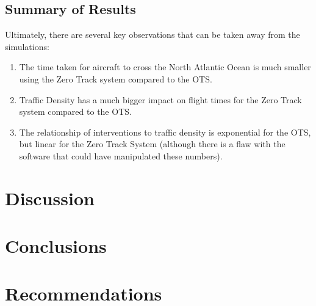 \documentclass[stu, a4paper, 12pt, floatsintext]{apa7}
\numberwithin{figure}{section}
\numberwithin{table}{section}
\numberwithin{equation}{section}
\begin{document}
\subsection{Summary of Results}
Ultimately, there are several key observations that can be taken away from the simulations:
\begin{enumerate}
    \item The time taken for aircraft to cross the North Atlantic Ocean is much smaller using the Zero Track system compared to the OTS. 
    \item Traffic Density has a much bigger impact on flight times for the Zero Track system compared to the OTS. 
    \item The relationship of interventions to traffic density is exponential for the OTS, but linear for the Zero Track System (although there is a flaw with the software that could have manipulated these numbers). 
\end{enumerate}

\newpage
\section{Discussion}

\section{Conclusions}
\section{Recommendations}

\printbibliography
\end{document}
